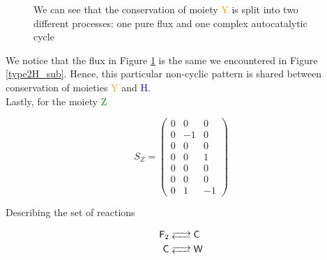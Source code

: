 \documentclass{article}
\begin{document}
\begin{figure}[H]
\begin{center}
\begin{minipage}{0.45\textwidth}
    \end{minipage}
    
\end{center}
\caption{We can see that the conservation of moiety \textcolor{orange}{Y} is split into two different processes: one pure flux and one complex autocatalytic cycle}
\label{type2Y_sub}
\end{figure}

We notice that the flux in Figure \ref{type2Y_sub} is the same we encountered in Figure \ref{type2H_sub}. Hence, this particular non-cyclic pattern is shared between conservation of moieties \textcolor{orange}{Y} and \textcolor{blue}{H}. \\

Lastly, for the moiety \textcolor{green}{Z}

\begin{center}
    \begin{equation}
        S_{Z}=\begin{pmatrix}
            0 & 0 & 0 \\
            0 & -1 & 0 \\
            0 & 0 & 0 \\
            0 & 0 & 1 \\
            0 & 0 & 0 \\
            0 & 0 & 0 \\
            0 & 1 & -1
\end{pmatrix}
    \end{equation}
        \end{center}

Describing the set of reactions

\begin{equation}
		\begin{split}
  \ce{\textsf{F}_2 & <--> \textsf{C} }	\\
  \ce{\textsf{C} & <-->  \textsf{W} } 
		\end{split} 
\end{equation}
\end{document}
